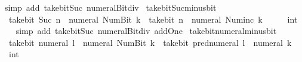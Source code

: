 \begin{isabellebody}
%
\isatagproof
{}\isamarkupfalse%
\ {\isacharparenleft}{\kern0pt}simp\ add{\isacharcolon}{\kern0pt}\ take{\isacharunderscore}{\kern0pt}bit{\isacharunderscore}{\kern0pt}Suc\ numeral{\isacharunderscore}{\kern0pt}Bit{}{\isacharunderscore}{\kern0pt}div{\isacharunderscore}{\kern0pt}{}{\isacharparenright}{\kern0pt}%
\endisatagproof
{\isafoldproof}%
%
\isadelimproof
\isanewline
%
\endisadelimproof
\isanewline
{}\isamarkupfalse%
\ take{\isacharunderscore}{\kern0pt}bit{\isacharunderscore}{\kern0pt}Suc{\isacharunderscore}{\kern0pt}minus{\isacharunderscore}{\kern0pt}bit{}{\isacharcolon}{\kern0pt}\isanewline
\ \ {\isacartoucheopen}take{\isacharunderscore}{\kern0pt}bit\ {\isacharparenleft}{\kern0pt}Suc\ n{\isacharparenright}{\kern0pt}\ {\isacharparenleft}{\kern0pt}{\isacharminus}{\kern0pt}\ numeral\ {\isacharparenleft}{\kern0pt}Num{\isachardot}{\kern0pt}Bit{}\ k{\isacharparenright}{\kern0pt}{\isacharparenright}{\kern0pt}\ {\isacharequal}{\kern0pt}\ take{\isacharunderscore}{\kern0pt}bit\ n\ {\isacharparenleft}{\kern0pt}{\isacharminus}{\kern0pt}\ numeral\ {\isacharparenleft}{\kern0pt}Num{\isachardot}{\kern0pt}inc\ k{\isacharparenright}{\kern0pt}{\isacharparenright}{\kern0pt}\ {\isacharasterisk}{\kern0pt}\ {}\ {\isacharplus}{\kern0pt}\ {\isacharparenleft}{\kern0pt}{}\ {\isacharcolon}{\kern0pt}{\isacharcolon}{\kern0pt}\ int{\isacharparenright}{\kern0pt}{\isacartoucheclose}\isanewline
%
\isadelimproof
\ \ %
\endisadelimproof
%
\isatagproof
{}\isamarkupfalse%
\ {\isacharparenleft}{\kern0pt}simp\ add{\isacharcolon}{\kern0pt}\ take{\isacharunderscore}{\kern0pt}bit{\isacharunderscore}{\kern0pt}Suc\ numeral{\isacharunderscore}{\kern0pt}Bit{}{\isacharunderscore}{\kern0pt}div{\isacharunderscore}{\kern0pt}{}\ add{\isacharunderscore}{\kern0pt}One{\isacharparenright}{\kern0pt}%
\endisatagproof
{\isafoldproof}%
%
\isadelimproof
\isanewline
%
\endisadelimproof
\isanewline
{}\isamarkupfalse%
\ take{\isacharunderscore}{\kern0pt}bit{\isacharunderscore}{\kern0pt}numeral{\isacharunderscore}{\kern0pt}minus{\isacharunderscore}{\kern0pt}bit{}{\isacharcolon}{\kern0pt}\isanewline
\ \ {\isacartoucheopen}take{\isacharunderscore}{\kern0pt}bit\ {\isacharparenleft}{\kern0pt}numeral\ l{\isacharparenright}{\kern0pt}\ {\isacharparenleft}{\kern0pt}{\isacharminus}{\kern0pt}\ numeral\ {\isacharparenleft}{\kern0pt}Num{\isachardot}{\kern0pt}Bit{}\ k{\isacharparenright}{\kern0pt}{\isacharparenright}{\kern0pt}\ {\isacharequal}{\kern0pt}\ take{\isacharunderscore}{\kern0pt}bit\ {\isacharparenleft}{\kern0pt}pred{\isacharunderscore}{\kern0pt}numeral\ l{\isacharparenright}{\kern0pt}\ {\isacharparenleft}{\kern0pt}{\isacharminus}{\kern0pt}\ numeral\ k{\isacharparenright}{\kern0pt}\ {\isacharasterisk}{\kern0pt}\ {\isacharparenleft}{\kern0pt}{}\ {\isacharcolon}{\kern0pt}{\isacharcolon}{\kern0pt}\ int{\isacharparenright}{\kern0pt}{\isacartoucheclose}\isanewline

\end{isabellebody}
